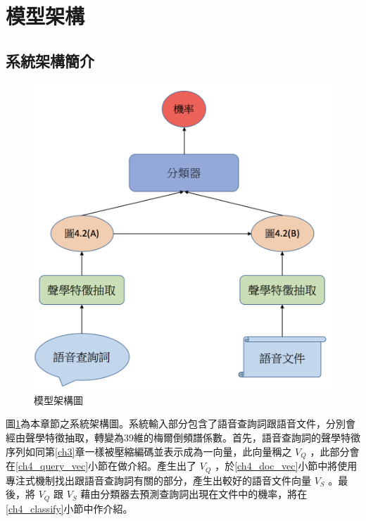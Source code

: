 \section{模型架構}
\subsection{系統架構簡介}
\begin{figure}[h]
\centering
\includegraphics[scale=0.5]{images/ch4_model.png} 
\caption{模型架構圖}
\label{ch4_system}
\end{figure}
圖\ref{ch4_system}為本章節之系統架構圖。系統輸入部分包含了語音查詢詞跟語音文件，分別會經由聲學特徵抽取，轉變為39維的梅爾倒頻譜係數。首先，語音查詢詞的聲學特徵序列如同第\ref{ch3}章一樣被壓縮編碼並表示成為一向量，此向量稱之
$V_Q$ ，此部分會在\ref{ch4_query_vec}小節在做介紹。產生出了 $V_Q$
，於\ref{ch4_doc_vec}小節中將使用專注式機制找出跟語音查詢詞有關的部分，產生出較好的語音文件向量
$V_S$ 。最後，將 $V_Q$ 跟 $V_S$
藉由分類器去預測查詢詞出現在文件中的機率，將在\ref{ch4_classify}小節中作介紹。
